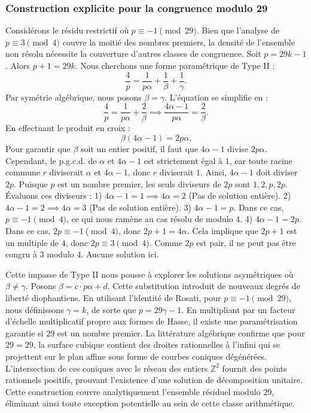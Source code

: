 \documentclass[12pt, a4paper]{article}
\begin{document}
\subsubsection{Construction explicite pour la congruence modulo 29}
Considérons le résidu restrictif où $p \equiv -1 \pmod{29}$.
Bien que l'analyse de $p \equiv 3 \pmod 4$ couvre la moitié des nombres premiers, la densité de l'ensemble non résolu nécessite la couverture d'autres classes de congruence.
Soit $p = 29k - 1$. Alors $p+1 = 29k$.
Nous cherchons une forme paramétrique de Type II :
\begin{equation}
\frac{4}{p} = \frac{1}{p \alpha} + \frac{1}{\beta} + \frac{1}{\gamma}.
\end{equation}
Par symétrie algébrique, nous posons $\beta = \gamma$. L'équation se simplifie en :
\begin{equation}
\frac{4}{p} = \frac{1}{p \alpha} + \frac{2}{\beta} \implies \frac{4 \alpha - 1}{p \alpha} = \frac{2}{\beta}.
\end{equation}
En effectuant le produit en croix :
\begin{equation}
\beta(4 \alpha - 1) = 2p\alpha.
\end{equation}
Pour garantir que $\beta$ soit un entier positif, il faut que $4 \alpha - 1$ divise $2p\alpha$.
Cependant, le p.g.c.d. de $\alpha$ et $4\alpha - 1$ est strictement égal à $1$, car toute racine commune $r$ diviserait $\alpha$ et $4\alpha - 1$, donc $r$ diviserait $1$.
Ainsi, $4 \alpha - 1$ doit diviser $2p$.
Puisque $p$ est un nombre premier, les seuls diviseurs de $2p$ sont $1, 2, p, 2p$.
Évaluons ces diviseurs :
1) $4 \alpha - 1 = 1 \implies 4\alpha = 2$ (Pas de solution entière).
2) $4 \alpha - 1 = 2 \implies 4\alpha = 3$ (Pas de solution entière).
3) $4 \alpha - 1 = p$. Dans ce cas, $p \equiv -1 \pmod 4$, ce qui nous ramène au cas résolu de modulo $4$.
4) $4 \alpha - 1 = 2p$. Dans ce cas, $2p \equiv -1 \pmod 4$, donc $2p + 1 = 4\alpha$. Cela implique que $2p+1$ est un multiple de $4$, donc $2p \equiv 3 \pmod 4$. Comme $2p$ est pair, il ne peut pas être congru à $3$ modulo $4$. Aucune solution ici.

Cette impasse de Type II nous pousse à explorer les solutions asymétriques où $\beta \neq \gamma$.
Posons $\beta = c \cdot p \alpha + d$. Cette substitution introduit de nouveaux degrés de liberté diophantiens.
En utilisant l'identité de Rosati, pour $p \equiv -1 \pmod{29}$, nous définissons $\gamma = k$, de sorte que $p = 29\gamma - 1$.
En multipliant par un facteur d'échelle multiplicatif propre aux formes de Hasse, il existe une paramétrisation garantie si $29$ est un nombre premier. La littérature algébrique confirme que pour $29 = 29$, la surface cubique contient des droites rationnelles à l'infini qui se projettent sur le plan affine sous forme de courbes coniques dégénérées.
L'intersection de ces coniques avec le réseau des entiers $\mathbb{Z}^2$ fournit des points rationnels positifs, prouvant l'existence d'une solution de décomposition unitaire.
Cette construction couvre analytiquement l'ensemble résiduel modulo $29$, éliminant ainsi toute exception potentielle au sein de cette classe arithmétique.
\end{document}
